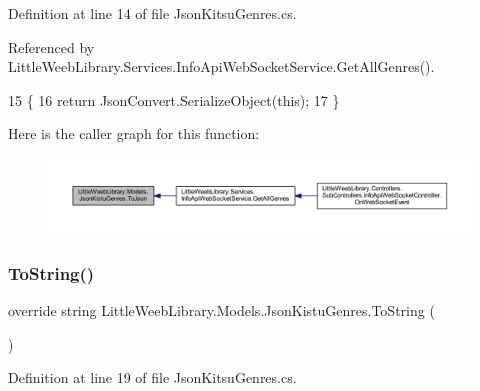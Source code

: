 Definition at line 14 of file Json\+Kitsu\+Genres.\+cs.



Referenced by Little\+Weeb\+Library.\+Services.\+Info\+Api\+Web\+Socket\+Service.\+Get\+All\+Genres().


\begin{DoxyCode}
15         \{
16             \textcolor{keywordflow}{return} JsonConvert.SerializeObject(\textcolor{keyword}{this});
17         \}
\end{DoxyCode}
Here is the caller graph for this function\+:\nopagebreak
\begin{figure}[H]
\begin{center}
\leavevmode
\includegraphics[width=350pt]{class_little_weeb_library_1_1_models_1_1_json_kistu_genres_aad51f41f73ee3bb3f21196e721af3658_icgraph}
\end{center}
\end{figure}
\mbox{\label{class_little_weeb_library_1_1_models_1_1_json_kistu_genres_aff942cf4016346e9df66de3b8c2b7cf6}} 
\subsubsection{\texorpdfstring{To\+String()}{ToString()}}
{\footnotesize\ttfamily override string Little\+Weeb\+Library.\+Models.\+Json\+Kistu\+Genres.\+To\+String (\begin{DoxyParamCaption}{ }\end{DoxyParamCaption})}



Definition at line 19 of file Json\+Kitsu\+Genres.\+cs.


